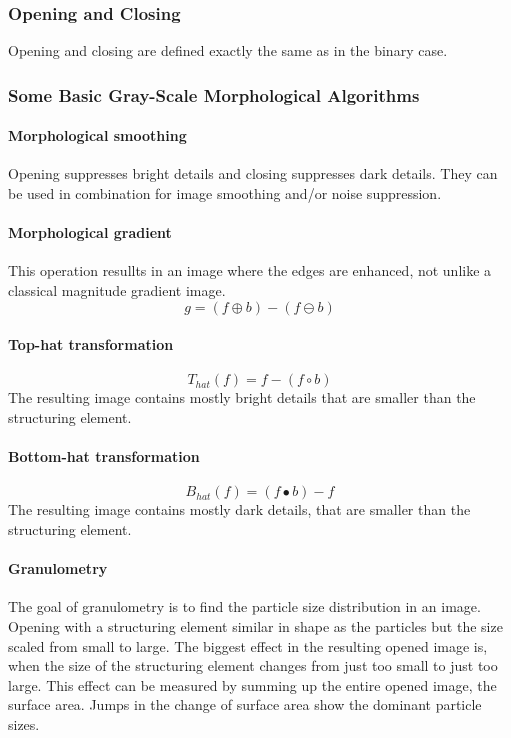 \subsubsection{Opening and Closing}
Opening and closing are defined exactly the same as in the binary case.
\subsubsection{Some Basic Gray-Scale Morphological Algorithms}
\paragraph{Morphological smoothing}
Opening suppresses bright details and closing suppresses dark details. They can be used in combination for image smoothing and/or noise suppression.
\paragraph{Morphological gradient}
This operation resullts in an image where the edges are enhanced, not unlike a classical magnitude gradient image.
\[
	g=(f\oplus b)-(f\ominus b)
\]
\paragraph{Top-hat transformation}
\[
	T_{hat}(f) = f -(f \circ b)
\]
The resulting image contains mostly bright details that are smaller than the structuring element.
\paragraph{Bottom-hat transformation}
\[
	B_{hat}(f) = (f \bullet b)-f
\]
The resulting image contains mostly dark details, that are smaller than the structuring element.
\paragraph{Granulometry}
The goal of granulometry is to find the particle size distribution in an image. Opening with a structuring element similar in shape as the particles but the size scaled from small to large. The biggest effect in the resulting opened image is, when the size of the structuring element changes from just too small to just too large. This effect can be measured by summing up the entire opened image, the surface area. Jumps in the change of surface area show the dominant particle sizes.
